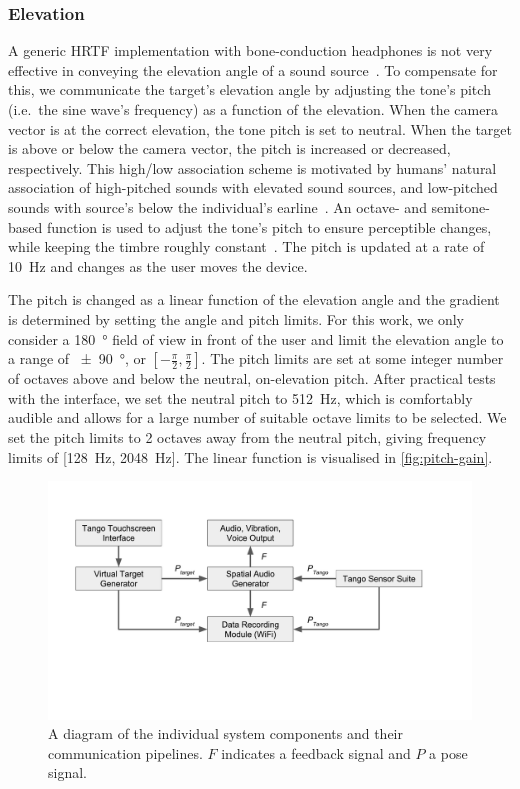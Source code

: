 \documentclass{llncs}
\begin{document}
\subsubsection{Elevation}

A generic HRTF implementation with bone-conduction headphones is not very effective in conveying the elevation angle of a sound source~\cite{macdonald2006spatial,schonstein2008comparison}.
To compensate for this, we communicate the target's elevation angle by adjusting the tone's pitch (i.e.\ the sine wave's frequency) as a function of the elevation. 
When the camera vector is at the correct elevation, the tone pitch is set to neutral.
When the target is above or below the camera vector, the pitch is increased or decreased, respectively.
This high/low association scheme is motivated by humans' natural association of high-pitched sounds with elevated sound sources, and low-pitched sounds with source's below the individual's earline~\cite{pratt1930spatial,blauert1997spatial}.
An octave- and semitone-based function is used to adjust the tone's pitch to ensure perceptible changes, while keeping the timbre roughly constant~\cite{shepard1964circularity}.
The pitch is updated at a rate of \SI{10}{\hertz} and changes as the user moves the device.

The pitch is changed as a linear function of the elevation angle and the gradient is determined by setting the angle and pitch limits.
For this work, we only consider a \SI{180}{\degree} field of view in front of the user and limit the elevation angle to a range of \SI{\pm90}{\degree}, or $[-\frac{\pi}{2}, \frac{\pi}{2}]$.
The pitch limits are set at some integer number of octaves above and below the neutral, on-elevation pitch.
After practical tests with the interface, we set the neutral pitch to \SI{512}{\hertz}, which is comfortably audible and allows for a large number of suitable octave limits to be selected.
We set the pitch limits to 2 octaves away from the neutral pitch, giving frequency limits of [\SI{128}{\hertz}, \SI{2048}{\hertz}].
The linear function is visualised in \cref{fig:pitch-gain}.

\begin{figure}[t]
  \centering
  \includegraphics[clip=true, trim=0 120 80 50, width=0.9\columnwidth]{figures/pipeline.pdf}
  \caption{A diagram of the individual system components and their communication pipelines. $F$ indicates a feedback signal and $P$ a pose signal. }\label{fig:pipeline}
\end{figure}
\end{document}
